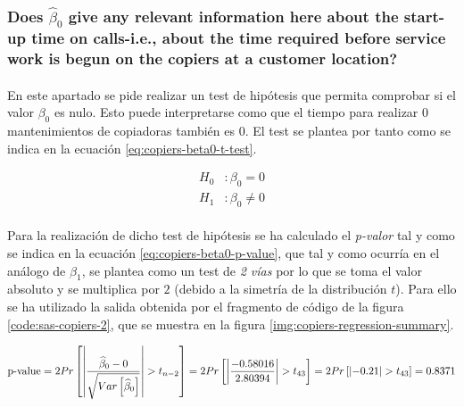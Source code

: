 \documentclass{article}
\begin{document}
      \subsubsection{Does $\widehat{\beta}_0$ give any relevant information here about the start-up time on calls-i.e., about the time required before service work is begun on the copiers at a customer location?}
      \label{sec:copiers-2.5e}

        \paragraph{}
        En este apartado se pide realizar un test de hipótesis que permita comprobar si el valor $\beta_0$ es nulo. Esto puede interpretarse como que el tiempo para realizar $0$ mantenimientos de copiadoras también es $0$. El test se plantea por tanto como se indica en la ecuación \eqref{eq:copiers-beta0-t-test}.

        \begin{equation}
          \label{eq:copiers-beta0-t-test}
          \begin{split}
            H_0&: \beta_0 = 0 \\
            H_1&: \beta_0 \neq 0
          \end{split}
        \end{equation}

        \paragraph{}
        Para la realización de dicho test de hipótesis se ha calculado el \emph{p-valor} tal y como se indica en la ecuación \eqref{eq:copiers-beta0-p-value}, que tal y como ocurría en el análogo de $\beta_1$, se plantea como un test de \emph{2 vías} por lo que se toma el valor absoluto y se multiplica por $2$ (debido a la simetría de la distribución $t$). Para ello se ha utilizado la salida obtenida por el fragmento de código de la figura \ref{code:sas-copiers-2}, que se muestra en la figura \ref{img:copiers-regression-summary}.

        \begin{equation}
          \label{eq:copiers-beta0-p-value}
            \text{p-value}
            = 2Pr\left[\left|\frac{\widehat{\beta}_0 - 0}{\sqrt{Var\left[\widehat{\beta}_0\right]}}\right| > t_{n-2}\right]
            = 2Pr\left[\left|\frac{-0.58016}{2.80394}\right| > t_{43}\right]
            = 2Pr\left[\left|-0.21\right| > t_{43} \right]
            = 0.8371
        \end{equation}
\end{document}
